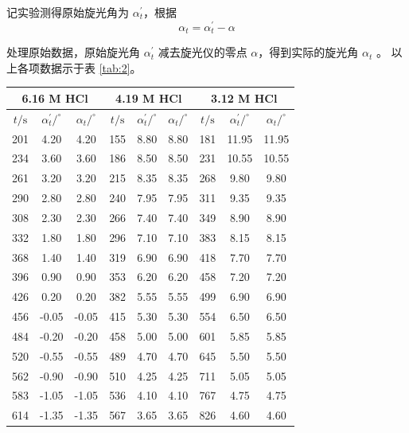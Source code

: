 记实验测得原始旋光角为 $\alpha_t^{\prime}$，根据
$$
\alpha_t=\alpha_t^{\prime}-\alpha
$$

处理原始数据，原始旋光角 $\alpha_t^{\prime}$ 减去旋光仪的零点 $\alpha$，得到实际的旋光角 $\alpha_t$ 。 以上各项数据示于表 \ref{tab:2}。

\begin{table}[H]
    \centering
    \begin{tabular}{ccc|ccc|ccc}
        \toprule
        \multicolumn{3}{c|}{6.16 M HCl} & \multicolumn{3}{c|}{4.19 M HCl} & \multicolumn{3}{c}{3.12 M HCl} \\
        \midrule
        $t/ \mathrm{s}$ & $\alpha_t^{\prime}/^{\circ}$ & $\alpha_t/^{\circ}$ & $t/ \mathrm{s}$ & $\alpha_t^{\prime}/^{\circ}$ & $\alpha_t/^{\circ}$ & $t/ \mathrm{s}$ & $\alpha_t^{\prime}/^{\circ}$ & $\alpha_t/^{\circ}$ \\
        \midrule
        201 & 4.20 & 4.20 & 155 & 8.80 & 8.80 & 181 & 11.95 & 11.95 \\
        234 & 3.60 & 3.60 & 186 & 8.50 & 8.50 & 231 & 10.55 & 10.55 \\
        261 & 3.20 & 3.20 & 215 & 8.35 & 8.35 & 268 & 9.80 & 9.80 \\
        290 & 2.80 & 2.80 & 240 & 7.95 & 7.95 & 311 & 9.35 & 9.35 \\
        308 & 2.30 & 2.30 & 266 & 7.40 & 7.40 & 349 & 8.90 & 8.90 \\
        332 & 1.80 & 1.80 & 296 & 7.10 & 7.10 & 383 & 8.15 & 8.15 \\
        368 & 1.40 & 1.40 & 319 & 6.90 & 6.90 & 418 & 7.70 & 7.70 \\
        396 & 0.90 & 0.90 & 353 & 6.20 & 6.20 & 458 & 7.20 & 7.20 \\
        426 & 0.20 & 0.20 & 382 & 5.55 & 5.55 & 499 & 6.90 & 6.90 \\
        456 & -0.05 & -0.05 & 415 & 5.30 & 5.30 & 554 & 6.50 & 6.50 \\
        484 & -0.20 & -0.20 & 458 & 5.00 & 5.00 & 601 & 5.85 & 5.85 \\
        520 & -0.55 & -0.55 & 489 & 4.70 & 4.70 & 645 & 5.50 & 5.50 \\
        562 & -0.90 & -0.90 & 510 & 4.25 & 4.25 & 711 & 5.05 & 5.05 \\
        583 & -1.05 & -1.05 & 536 & 4.10 & 4.10 & 767 & 4.75 & 4.75 \\
        614 & -1.35 & -1.35 & 567 & 3.65 & 3.65 & 826 & 4.60 & 4.60 \\

\end{tabular}
\end{table}
